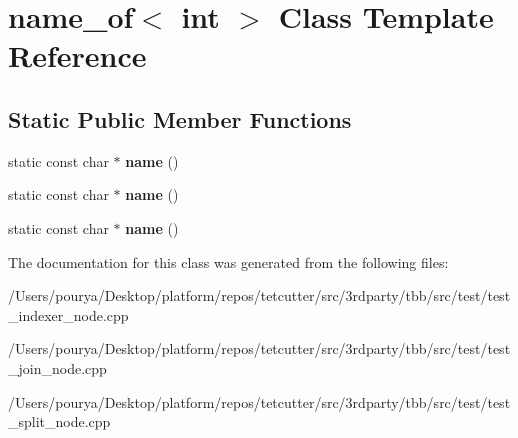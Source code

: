 \hypertarget{classname__of_3_01int_01_4}{}\section{name\+\_\+of$<$ int $>$ Class Template Reference}
\label{classname__of_3_01int_01_4}
\subsection*{Static Public Member Functions}
\begin{DoxyCompactItemize}
\item 
\hypertarget{classname__of_3_01int_01_4_a20b34c7f4a71964c1e6edddaf23e400f}{}static const char $\ast$ {\bfseries name} ()\label{classname__of_3_01int_01_4_a20b34c7f4a71964c1e6edddaf23e400f}

\item 
\hypertarget{classname__of_3_01int_01_4_a20b34c7f4a71964c1e6edddaf23e400f}{}static const char $\ast$ {\bfseries name} ()\label{classname__of_3_01int_01_4_a20b34c7f4a71964c1e6edddaf23e400f}

\item 
\hypertarget{classname__of_3_01int_01_4_a20b34c7f4a71964c1e6edddaf23e400f}{}static const char $\ast$ {\bfseries name} ()\label{classname__of_3_01int_01_4_a20b34c7f4a71964c1e6edddaf23e400f}

\end{DoxyCompactItemize}


The documentation for this class was generated from the following files\+:\begin{DoxyCompactItemize}
\item 
/\+Users/pourya/\+Desktop/platform/repos/tetcutter/src/3rdparty/tbb/src/test/test\+\_\+indexer\+\_\+node.\+cpp\item 
/\+Users/pourya/\+Desktop/platform/repos/tetcutter/src/3rdparty/tbb/src/test/test\+\_\+join\+\_\+node.\+cpp\item 
/\+Users/pourya/\+Desktop/platform/repos/tetcutter/src/3rdparty/tbb/src/test/test\+\_\+split\+\_\+node.\+cpp\end{DoxyCompactItemize}
